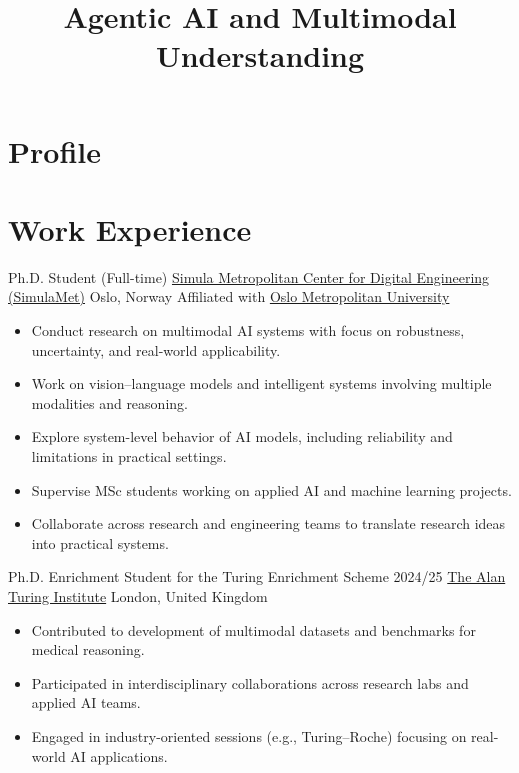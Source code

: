 \documentclass[11pt,a4paper,sans]{moderncv}
\title{Agentic AI and Multimodal Understanding}
\begin{document}
\makecvtitle
\vspace*{-2.0\baselineskip}

\section{Profile}

\section{Work Experience}

{Ph.D. Student (Full-time)}
{\href{https://www.simulamet.no/people/sushant}{Simula Metropolitan Center for Digital Engineering (SimulaMet)}}
{Oslo, Norway}
{Affiliated with \href{https://www.oslomet.no/en}{Oslo Metropolitan University}}
{
\begin{itemize}
\item Conduct research on multimodal AI systems with focus on robustness, uncertainty, and real-world applicability.
\item Work on vision–language models and intelligent systems involving multiple modalities and reasoning.
\item Explore system-level behavior of AI models, including reliability and limitations in practical settings.
\item Supervise MSc students working on applied AI and machine learning projects.
\item Collaborate across research and engineering teams to translate research ideas into practical systems.
\end{itemize}
}

{Ph.D. Enrichment Student for the Turing Enrichment Scheme 2024/25}
{\href{https://www.turing.ac.uk/people/doctoral-students/sushant-gautam}{The Alan Turing Institute}}
{London, United Kingdom}
{}
{
\begin{itemize}
\item Contributed to development of multimodal datasets and benchmarks for medical reasoning.
\item Participated in interdisciplinary collaborations across research labs and applied AI teams.
\item Engaged in industry-oriented sessions (e.g., Turing–Roche) focusing on real-world AI applications.
\end{itemize}
}
\end{document}
